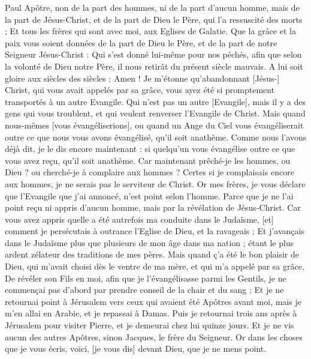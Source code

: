 \BFont
\begin{multicols}{2}
\VerseOne{}Paul Apôtre, non de la part des hommes, ni de la part d'aucun homme, mais de la part de Jésus-Christ, et de la part de Dieu le Père, qui l'a ressuscité des morts ;
Et tous les frères qui sont avec moi, aux Eglises de Galatie.
Que la grâce et la paix vous soient données de la part de Dieu le Père, et de la part de notre Seigneur Jésus-Christ :
Qui s'est donné lui-même pour nos péchés, afin que selon la volonté de Dieu notre Père, il nous retirât du présent siècle mauvais.
A lui soit gloire aux siècles des siècles ; Amen !
Je m'étonne qu'abandonnant [Jésus-] Christ, qui vous avait appelés par sa grâce, vous ayez été si promptement transportés à un autre Evangile.
Qui n'est pas un autre [Evangile], mais il y a des gens qui vous troublent, et qui veulent renverser l'Evangile de Christ.
Mais quand nous-mêmes [vous évangéliserions], ou quand un Ange du Ciel vous évangéliserait outre ce que nous vous avons évangélisé, qu'il soit anathème.
Comme nous l'avons déjà dit, je le dis encore maintenant : si quelqu'un vous évangélise outre ce que vous avez reçu, qu'il soit anathème.
Car maintenant prêché-je les hommes, ou Dieu ? ou cherché-je à complaire aux hommes ? Certes si je complaisais encore aux hommes, je ne serais pas le serviteur de Christ.
Or mes frères, je vous déclare que l'Evangile que j'ai annoncé, n'est point selon l'homme.
Parce que je ne l'ai point reçu ni appris d'aucun homme, mais par la révélation de Jésus-Christ.
Car vous avez appris quelle a été autrefois ma conduite dans le Judaïsme, [et] comment je persécutais à outrance l'Eglise de Dieu, et la ravageais ;
Et j'avançais dans le Judaïsme plus que plusieurs de mon âge dans ma nation ; étant le plus ardent zélateur des traditions de mes pères.
Mais quand ç'a été le bon plaisir de Dieu, qui m'avait choisi dès le ventre de ma mère, et qui m'a appelé par sa grâce,
De révéler son Fils en moi, afin que je l'évangélisasse parmi les Gentils, je ne commençai pas d'abord par prendre conseil de la chair et du sang ;
Et je ne retournai point à Jérusalem vers ceux qui avaient été Apôtres avant moi, mais je m'en allai en Arabie, et je repassai à Damas.
Puis je retournai trois ans après à Jérusalem pour visiter Pierre, et je demeurai chez lui quinze jours.
Et je ne vis aucun des autres Apôtres, sinon Jacques, le frère du Seigneur.
Or dans les choses que je vous écris, voici, [je vous dis] devant Dieu, que je ne mens point.

\end{multicols}
